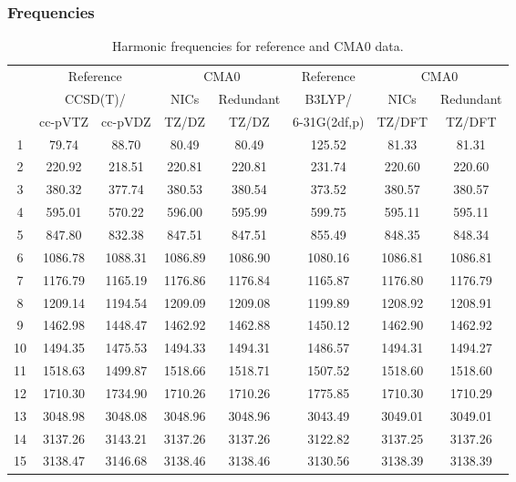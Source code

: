 \documentclass[10pt,oneside]{article}
\begin{document}
\begin{table}[h!]
\subsubsection*{Frequencies}
\centering
\caption{Harmonic frequencies for reference and CMA0 data.}
\begin{tabular}{cccccccc}
\toprule
{} & \multicolumn{2}{c}{Reference} & \multicolumn{2}{c}{CMA0} &    Reference & \multicolumn{2}{c}{CMA0} \\
{} & \multicolumn{2}{c}{CCSD(T)/} &    NICs &  Redundant &       B3LYP/ &    NICs & Redundant \\
{} &   cc-pVTZ & cc-pVDZ &   TZ/DZ &      TZ/DZ & 6-31G(2df,p) &  TZ/DFT &    TZ/DFT \\
\midrule
1  &     79.74 &   88.70 &   80.49 &      80.49 &       125.52 &   81.33 &     81.31 \\
2  &    220.92 &  218.51 &  220.81 &     220.81 &       231.74 &  220.60 &    220.60 \\
3  &    380.32 &  377.74 &  380.53 &     380.54 &       373.52 &  380.57 &    380.57 \\
4  &    595.01 &  570.22 &  596.00 &     595.99 &       599.75 &  595.11 &    595.11 \\
5  &    847.80 &  832.38 &  847.51 &     847.51 &       855.49 &  848.35 &    848.34 \\
6  &   1086.78 & 1088.31 & 1086.89 &    1086.90 &      1080.16 & 1086.81 &   1086.81 \\
7  &   1176.79 & 1165.19 & 1176.86 &    1176.84 &      1165.87 & 1176.80 &   1176.79 \\
8  &   1209.14 & 1194.54 & 1209.09 &    1209.08 &      1199.89 & 1208.92 &   1208.91 \\
9  &   1462.98 & 1448.47 & 1462.92 &    1462.88 &      1450.12 & 1462.90 &   1462.92 \\
10 &   1494.35 & 1475.53 & 1494.33 &    1494.31 &      1486.57 & 1494.31 &   1494.27 \\
11 &   1518.63 & 1499.87 & 1518.66 &    1518.71 &      1507.52 & 1518.60 &   1518.60 \\
12 &   1710.30 & 1734.90 & 1710.26 &    1710.26 &      1775.85 & 1710.30 &   1710.29 \\
13 &   3048.98 & 3048.08 & 3048.96 &    3048.96 &      3043.49 & 3049.01 &   3049.01 \\
14 &   3137.26 & 3143.21 & 3137.26 &    3137.26 &      3122.82 & 3137.25 &   3137.26 \\
15 &   3138.47 & 3146.68 & 3138.46 &    3138.46 &      3130.56 & 3138.39 &   3138.39 \\
\bottomrule
\end{tabular}
\end{table}
\end{document}
